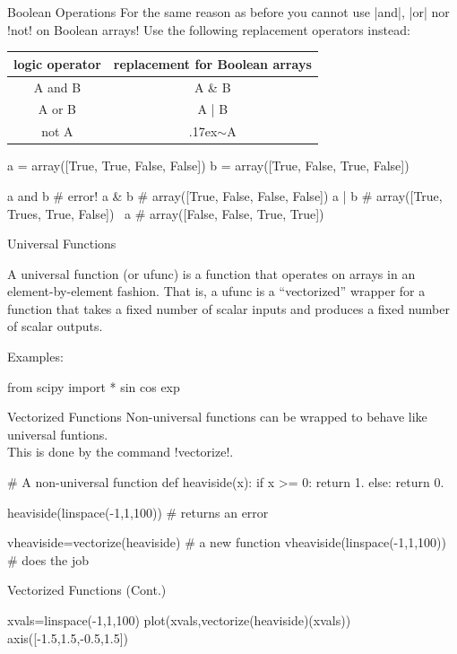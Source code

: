 \documentclass[hyperref={pdfpagelabels=false},table]{beamer}
\begin{document}
\begin{frame}[fragile]{Boolean Operations}
For the same reason as before you
\alert{cannot} use \pyth|and|, \pyth|or| nor \pyth!not! on Boolean arrays! Use the following replacement operators instead:

\newcommand{\mytilde}{\raise.17ex\hbox{$\scriptstyle\mathtt{\sim}$}}
\begin{center}
\begin{tabular}{c|c}
\hline
logic operator & replacement for Boolean arrays\\ \hline
A and B & A \& B \\ \hline
A or B & A | B\\ \hline
not A & \mytilde A \\ \hline
\end{tabular}
\end{center}

\begin{python}
a = array([True, True, False, False])
b = array([True, False, True, False])

a and b # error!
a & b # array([True, False, False, False])
a | b # array([True, Trues, True, False])
~a # array([False, False, True, True])
\end{python}
\end{frame}
\begin{frame}[fragile]{Universal Functions}
\begin{defblock}
A universal function (or ufunc) is a function that operates on arrays in an element-by-element fashion. That is, a ufunc is a “vectorized” wrapper for a function that takes a fixed number of scalar inputs and produces a fixed number of scalar outputs.
\end{defblock}
\vfill
Examples:
\begin{python}
from scipy import *
sin
cos
exp
\end{python}
\end{frame}
\begin{frame}[fragile]{Vectorized Functions}
Non-universal functions can be wrapped to behave like universal funtions.\\
This is done by the command \pyth!vectorize!.\\
\begin{python}
# A non-universal function
def heaviside(x):
   if x >= 0:
      return 1.
   else:
      return 0.

heaviside(linspace(-1,1,100))  # returns an error

vheaviside=vectorize(heaviside) # a new function
vheaviside(linspace(-1,1,100)) # does the job
\end{python}
\end{frame}
\begin{frame}[fragile]{Vectorized Functions \hfill (Cont.)}
\begin{python}
xvals=linspace(-1,1,100)
plot(xvals,vectorize(heaviside)(xvals))
axis([-1.5,1.5,-0.5,1.5])
\end{python}
\end{frame}
\end{document}
